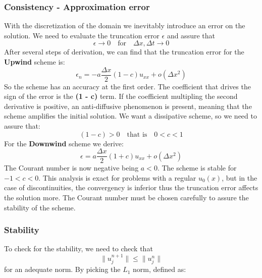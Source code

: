 \documentclass{report}
\begin{document}
\subsubsection*{Consistency - Approximation error}
With the discretization of the domain we inevitably introduce an error on the solution. We need to evaluate the truncation error $\epsilon$ and assure that
\begin{equation*}
    \epsilon \rightarrow 0 \quad \textrm{for} \quad \Delta x, \Delta t \rightarrow 0
\end{equation*}
After several steps of derivation, we can find that the truncation error for the \textbf{Upwind} scheme is:
\begin{equation*}
    \epsilon_n = -a \frac{\Delta x}{2}(1 - c)u_{xx} + o(\Delta x^2)
\end{equation*}
So the scheme has an accuracy at the first order. The coefficient that drives the sign of the error is the \textbf{(1 - c)} term.
If the coefficient multipling the second derivative is positive, an anti-diffusive phenomenon is present, meaning that the scheme amplifies the initial solution.
We want a dissipative scheme, so we need to assure that:
\begin{equation*}
    (1 - c) > 0 \quad \textrm{that is} \quad 0 < c < 1
\end{equation*}
For the \textbf{Downwind} scheme we derive:
\begin{equation*}
    \epsilon = a \frac{\Delta x}{2}(1 + c)u_{xx} + o(\Delta x^2)
\end{equation*}
The Courant number is now negative being $a < 0$. The scheme is stable for $-1 < c < 0$.
This analysis is exact for problems with a regular $u_0(x)$, but in the case of discontinuities, the convergency is inferior thus the
truncation error affects the solution more. The Courant number must be chosen carefully to assure the stability of the scheme.

\subsubsection*{Stability}
To check for the stability, we need to check that
\begin{equation*}
    \| u^{n+1}_j \| \leq \| u^n_j \|
\end{equation*}
for an adequate norm. By picking the $L_1$ norm, defined as:
\end{document}

